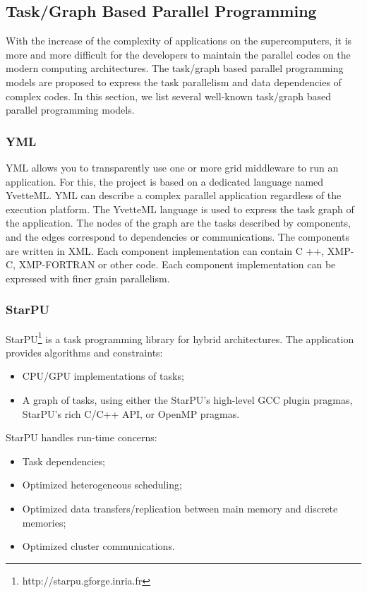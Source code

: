 \subsection{Task/Graph Based Parallel Programming}

With the increase of the complexity of applications on the supercomputers, it is more and more difficult for the developers to maintain the parallel codes on the modern computing architectures. The task/graph based parallel programming models are proposed to express the task parallelism and data dependencies of complex codes. In this section, we list several well-known task/graph based parallel programming models.

\subsubsection{YML}

YML \cite{delannoyyml} allows you to transparently use one or more grid middleware to run an application. For this, the project is based on a dedicated language named YvetteML. YML can describe a complex parallel application regardless of the execution platform. The YvetteML language is used to express the task graph of the application. The nodes of the graph are the tasks described by components, and the edges correspond to dependencies or communications. The components are written in XML. Each component implementation can contain C ++, XMP-C, XMP-FORTRAN or other code. Each component implementation can be expressed with finer grain parallelism.

\subsubsection{StarPU}

StarPU\footnote{http://starpu.gforge.inria.fr} \cite{augonnet2011starpu} is a task programming library for hybrid architectures. The application provides algorithms and constraints:
\begin{itemize}
	\item CPU/GPU implementations of tasks;
	\item A graph of tasks, using either the StarPU's high-level GCC plugin pragmas, StarPU's rich C/C++ API, or OpenMP pragmas.
\end{itemize}

StarPU handles run-time concerns:
\begin{itemize}
	\item Task dependencies;
	\item Optimized heterogeneous scheduling;
	\item Optimized data transfers/replication between main memory and discrete memories;
	\item Optimized cluster communications.
\end{itemize}
